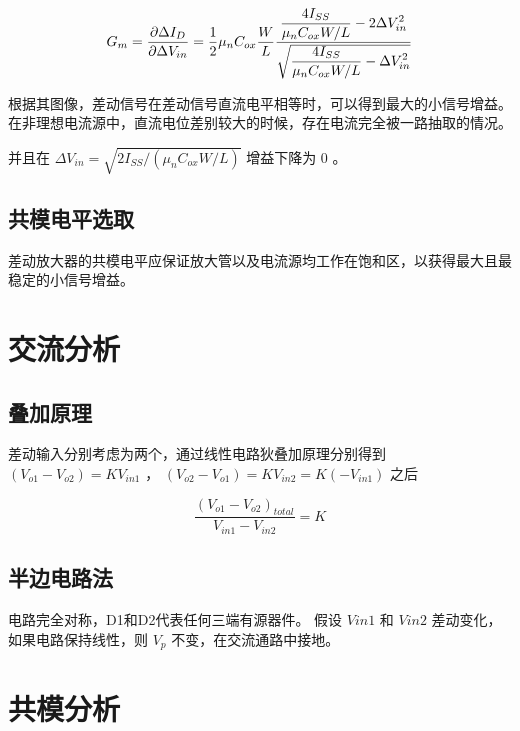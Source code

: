 \documentclass[cn,11pt,chinese,black,simple]{../elegantbook}
\begin{document}
\begin{equation}
    \begin{aligned}
        G_m = \frac{\partial \Delta I_D}{\partial \Delta V_{in}} = \frac{1}{2} \mu_n C_{ox} \frac{W}{L} \displaystyle\frac{\displaystyle\frac{4 I_{SS}}{\mu_n C_{ox} W/L} - 2\Delta V_{in}^2}{\sqrt{\displaystyle\frac{4 I_{SS}}{\mu_n C_{ox} W/L}-\Delta V_{in}^2}}
    \end{aligned}
\end{equation}


根据其图像，差动信号在差动信号直流电平相等时，可以得到最大的小信号增益。在非理想电流源中，直流电位差别较大的时候，存在电流完全被一路抽取的情况。

并且在 \(\Delta V_{in} = \sqrt{2 I_{SS} / (\mu_n C_{ox} W/L)}\) 增益下降为 \(0\) 。


\subsection{共模电平选取}

差动放大器的共模电平应保证放大管以及电流源均工作在饱和区，以获得最大且最稳定的小信号增益。


\section{交流分析}

\subsection{叠加原理}

差动输入分别考虑为两个，通过线性电路狄叠加原理分别得到 \((V_{o1}-V_{o2}) = K V_{in1}\) ， \((V_{o2}-V_{o1}) = K V_{in2} = K (- V_{in1})\) 之后

\[\frac{(V_{o1}-V_{o2})_{total}}{V_{in1}-V_{in2}} = K \]

\subsection{半边电路法}

电路完全对称，D1和D2代表任何三端有源器件。 假设 \(Vin1\) 和
\(Vin2\) 差动变化，如果电路保持线性，则 \(V_p\) 不变，在交流通路中接地。





\section{共模分析}
\end{document}
